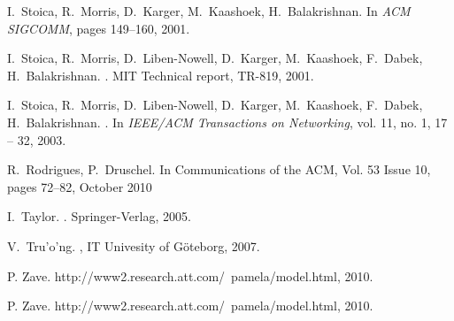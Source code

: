 \documentclass{amsart}
\theoremstyle{definition}
\begin{document}
\begin{thebibliography}{}
I.~Stoica, R.~Morris, D.~Karger, M.~Kaashoek, H.~Balakrishnan.
\newblock In {\em ACM SIGCOMM}, pages 149--160, 2001.

I.~Stoica, R.~Morris, D.~Liben-Nowell, D.~Karger, M.~Kaashoek, F.~Dabek, H.~Balakrishnan.
.
\newblock  MIT Technical report, TR-819, 2001.

I.~Stoica, R.~Morris, D.~Liben-Nowell, D.~Karger, M.~Kaashoek, F.~Dabek, H.~Balakrishnan.
.
\newblock  In {\em IEEE/ACM Transactions on Networking}, vol. 11, no. 1, 17 -- 32, 2003.

R.~Rodrigues, P.~Druschel.
\newblock In {Communications of the ACM}, Vol. 53 Issue 10, pages 72--82, October 2010

I.~Taylor.
.
\newblock Springer-Verlag, 2005.

V.~Tru'o'ng.
, IT Univesity of G\"{o}teborg, 2007.

P. Zave.
\newblock http://www2.research.att.com/~pamela/model.html, 2010.

P. Zave.
\newblock http://www2.research.att.com/~pamela/model.html, 2010.

\end{thebibliography}
\end{document}
